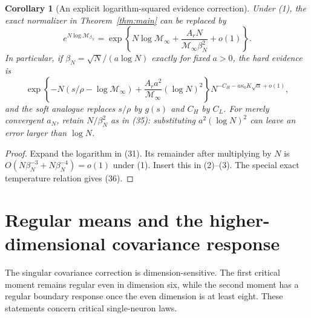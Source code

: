 \documentclass[11pt]{article}
\newtheorem{corollary}[theorem]{Corollary}
\begin{document}
\begin{corollary}[An explicit logarithm-squared evidence correction]
Under (1), the exact normalizer in Theorem~\ref{thm:main} can be replaced
by
\[
 e^{N\log\mathcal M_{\beta_N}}
 =\exp\left\{N\log\mathcal M_\infty+
                    \frac{A_rN}{\mathcal M_\infty\beta_N^2}+o(1)\right\}.
                                                               \tag{35}
\]
In particular, if $\beta_N=\sqrt N/(a\log N)$ exactly for fixed $a>0$,
the hard evidence is
\[
 \exp\left\{-N(s/\rho-\log\mathcal M_\infty)
           +\frac{A_ra^2}{\mathcal M_\infty}(\log N)^2\right\}
          N^{-C_H-a\kappa_0K\sqrt\alpha+o(1)},           \tag{36}
\]
and the soft analogue replaces $s/\rho$ by $g(s)$ and $C_H$ by $C_L$.
For merely convergent $a_N$, retain $N/\beta_N^2$ as in (35): substituting
$a^2(\log N)^2$ can leave an error larger than $\log N$.
\end{corollary}
\begin{proof}
Expand the logarithm in (31). Its remainder after multiplying by $N$
is $O(N\beta_N^{-3}+N\beta_N^{-4})=o(1)$ under (1).
Insert this in (2)--(3). The special exact temperature relation gives
(36).
\end{proof}

\section{Regular means and the higher-dimensional covariance response}
The singular covariance correction is dimension-sensitive. The first
critical moment remains regular even in dimension six, while the second
moment has a regular boundary response once the even dimension is at
least eight. These statements concern critical single-neuron laws.
\end{document}
